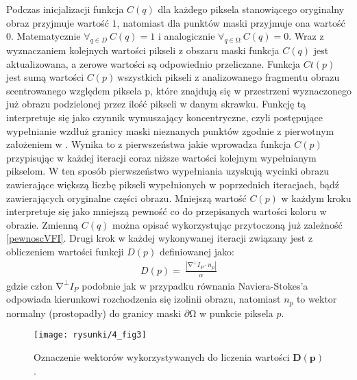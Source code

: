\documentclass[12pt, twoside, openany]{report}
\theoremstyle{definition}
\begin{document}
Podczas inicjalizacji funkcja $C(q)$ dla każdego piksela stanowiącego oryginalny obraz przyjmuje wartość $1$, natomiast dla punktów maski przyjmuje ona wartość $0$. Matematycznie ${\forall }_{q\in D}\ C\left(q\right)=1$  i analogicznie ${\forall }_{q\in \mathrm{\Omega }}\ C\left(q\right)=0$. Wraz z wyznaczaniem kolejnych wartości pikseli z obszaru maski funkcja $C\left(q\right)$ jest aktualizowana, a zerowe wartości są odpowiednio przeliczane. Funkcja $Ct\left(p\right)$ jest sumą wartości $C\left(p\right)\ $wszystkich pikseli z analizowanego fragmentu obrazu scentrowanego względem piksela p, które znajdują się w przestrzeni wyznaczonego już obrazu podzielonej przez ilość pikseli w danym skrawku. Funkcję tą interpretuje się jako czynnik wymuszający koncentryczne, czyli postępujące wypełnianie wzdłuż granicy maski nieznanych punktów zgodnie z pierwotnym założeniem w \cite{efros1999texture}. Wynika to z pierwszeństwa jakie wprowadza funkcja $C\left(p\right)$ przypisując w każdej iteracji coraz niższe wartości kolejnym wypełnianym pikselom. W ten sposób pierwszeństwo wypełniania uzyskują wycinki obrazu zawierające większą liczbę pikseli wypełnionych w poprzednich iteracjach, bądź zawierających oryginalne części obrazu. Mniejszą wartość $C\left(p\right)$ w każdym kroku interpretuje się jako mniejszą pewność co do przepisanych wartości koloru w obrazie. Zmienną $C(q)$ można opisać wykorzystując przytoczoną już zależność \eqref{pewnoscVFI}.
Drugi krok w każdej wykonywanej iteracji związany jest z obliczeniem wartości funkcji $D(p)$ definiowanej jako:
\begin{align}
D(p)=\ \frac{\left|{\mathrm{\nabla }}^{\bot }I_P\cdot n_p\right|}{\alpha }
\label{DataTerm}
\end{align}
gdzie człon ${\mathrm{\nabla }}^{\bot }I_P$ podobnie jak w przypadku równania Naviera-Stokes'a odpowiada kierunkowi rozchodzenia się izolinii obrazu, natomiast  $n_p$ to wektor normalny (prostopadły) do granicy maski $\partial \mathrm{\Omega }$ w punkcie piksela $p$.  
\begin{figure}[!h]
	\centering
	\texttt{[image: rysunki/4\_fig3]}
	\caption{Oznaczenie wektorów wykorzystywanych do liczenia wartości $\boldsymbol{D}\left(\boldsymbol{p}\right)$.}
	\label{4_fig3} 
\end{figure}
\end{document}
